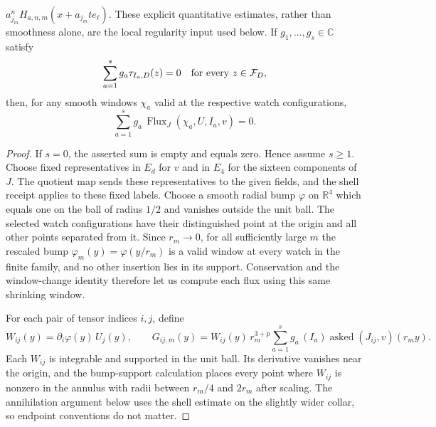 \begin{lemma}
$a_{j_m}^{n}H_{a,n,m}(x+a_{j_m}t e_\ell)$.  These explicit quantitative estimates, rather than smoothness
alone, are the local regularity input used below.  If
$g_1,\ldots,g_s\in\mathbb C$ satisfy
\begin{equation}\label{eq:ex-lattice-annulus-annihilator}
  \sum_{a=1}^s g_a\tau_{I_a,D}(z)=0
  \quad\hbox{for every }z\in\mathcal F_D,
\end{equation}
then, for any smooth windows $\chi_a$ valid at the respective watch
configurations,
\begin{equation}\label{eq:ex-lattice-annulus-flux-zero}
  \sum_{a=1}^s g_a\,\operatorname{Flux}_{J}
       (\chi_a,U,I_a,v)=0.
\end{equation}
\end{lemma}

\begin{proof}
If $s=0$, the asserted sum is empty and equals zero. Hence assume $s\ge1$.
Choose fixed representatives in $E_d$ for $v$ and in $E_4$ for the
sixteen components of $J$. The quotient map sends these representatives
to the given fields, and the shell receipt applies to these fixed labels.
Choose a smooth radial bump $\varphi$ on $\mathbb R^4$ which equals one on
the ball of radius $1/2$ and vanishes outside the unit ball.  The selected
watch configurations have their distinguished point at the origin and all
other points separated from it.  Since $r_m\to0$, for all sufficiently large
$m$ the rescaled bump $\varphi_m(y)=\varphi(y/r_m)$ is a valid window at every
watch in the finite family, and no other insertion lies in its support.
Conservation and the window-change identity therefore let us compute each
flux using this same shrinking window.

For each pair of tensor indices $i,j$, define
\[
  W_{ij}(y)=\partial_i\varphi(y)\,U_j(y),\qquad
  G_{ij,m}(y)=W_{ij}(y)\,r_m^{3+p}
       \sum_{a=1}^s g_a\,(I_a)\!\operatorname{asked}(J_{ij},v)(r_my).
\]
Each $W_{ij}$ is integrable and supported in the unit ball.  Its derivative
vanishes near the origin, and the bump-support calculation places every point
where $W_{ij}$ is nonzero in the annulus with radii between $r_m/4$ and
$2r_m$ after scaling.  The annihilation argument below uses the shell
estimate on the slightly wider collar, so endpoint conventions do not matter.


\end{proof}
